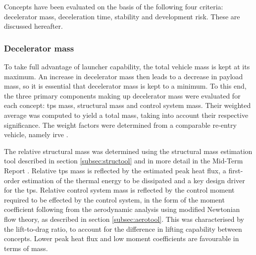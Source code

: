 Concepts have been evaluated on the basis of the following four criteria: decelerator mass, deceleration time, stability and development risk. These are discussed hereafter.

\subsubsection{Decelerator mass}
To take full advantage of launcher capability, the total vehicle mass is kept at its maximum. An increase in decelerator mass then leads to a decrease in payload mass, so it is essential that decelerator mass is kept to a minimum. To this end, the three primary components making up decelerator mass were evaluated for each concept: \gls{tps} mass, structural mass and control system mass. Their weighted average was computed to yield a total mass, taking into account their respective significance. The weight factors were determined from a comparable re-entry vehicle, namely \gls{irve} \cite{Hughes2005}.

The relative structural mass was determined using the structural mass estimation tool described in section \ref{subsec:structool} and in more detail in the Mid-Term Report \cite[p.47-66]{Balasooriyan2015b}. Relative \gls{tps} mass is reflected by the estimated peak heat flux, a first-order estimation of the thermal energy to be dissipated and a key design driver for the \gls{tps}. Relative control system mass is reflected by the control moment required to be effected by the control system, in the form of the moment coefficient following from the aerodynamic analysis using modified Newtonian flow theory, as described in section \ref{subsec:aerotool}. This was characterised by the lift-to-drag ratio, to account for the difference in lifting capability between concepts. Lower peak heat flux and low moment coefficients are favourable in terms of mass. 

